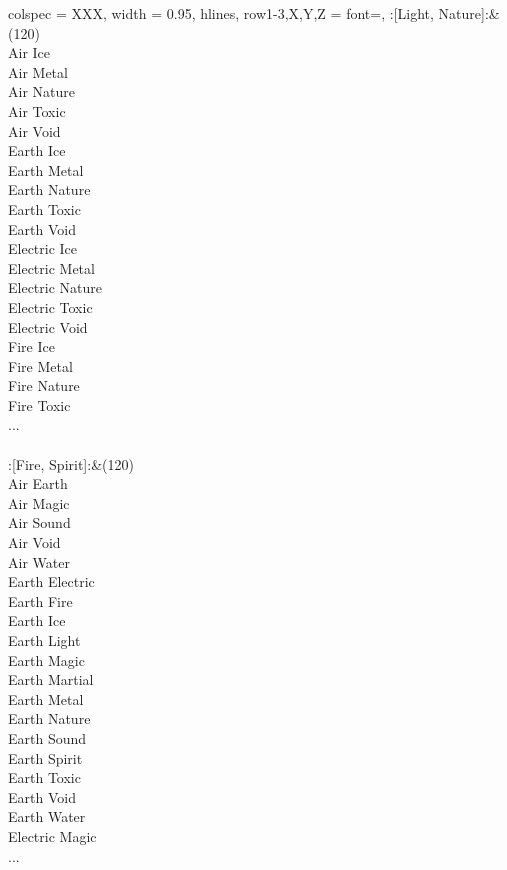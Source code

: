 \begin{longtblr}[
	caption = {2v2 Defending Weak},
	label = {2v2-Defending-Weak},
]{
	colspec = {XXX}, width = 0.95\linewidth,
	hlines,
	row{1-3,X,Y,Z} = {font=\bfseries},
}
	:[Light, Nature]:&{(120)\\
	Air Ice \\
	Air Metal \\
	Air Nature \\
	Air Toxic \\
	Air Void \\
	Earth Ice \\
	Earth Metal \\
	Earth Nature \\
	Earth Toxic \\
	Earth Void \\
	Electric Ice \\
	Electric Metal \\
	Electric Nature \\
	Electric Toxic \\
	Electric Void \\
	Fire Ice \\
	Fire Metal \\
	Fire Nature \\
	Fire Toxic \\
	...\\
	}\\

	:[Fire, Spirit]:&{(120)\\
	Air Earth \\
	Air Magic \\
	Air Sound \\
	Air Void \\
	Air Water \\
	Earth Electric \\
	Earth Fire \\
	Earth Ice \\
	Earth Light \\
	Earth Magic \\
	Earth Martial \\
	Earth Metal \\
	Earth Nature \\
	Earth Sound \\
	Earth Spirit \\
	Earth Toxic \\
	Earth Void \\
	Earth Water \\
	Electric Magic \\
	...\\
	}\\


\end{longtblr}

